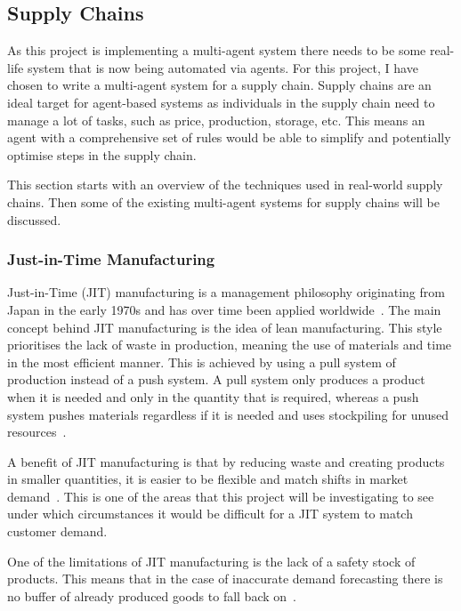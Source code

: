 \subsection{Supply Chains}

As this project is implementing a multi-agent system there needs to be some real-life system that is now being automated via agents.
For this project, I have chosen to write a multi-agent system for a supply chain.
Supply chains are an ideal target for agent-based systems as individuals in the supply chain need to manage a lot of tasks, such as price, production, storage, etc.
This means an agent with a comprehensive set of rules would be able to simplify and potentially optimise steps in the supply chain.

This section starts with an overview of the techniques used in real-world supply chains.
Then some of the existing multi-agent systems for supply chains will be discussed.

\subsubsection{Just-in-Time Manufacturing}

Just-in-Time (JIT) manufacturing is a management philosophy originating from Japan in the early 1970s and has over time been applied worldwide~\cite{javadian2013just}.
The main concept behind JIT manufacturing is the idea of lean manufacturing.
This style prioritises the lack of waste in production, meaning the use of materials and time in the most efficient manner.
This is achieved by using a pull system of production instead of a push system.
A pull system only produces a product when it is needed and only in the quantity that is required, whereas a push system pushes materials regardless if it is needed and uses stockpiling for unused resources~\cite{javadian2013just}.

A benefit of JIT manufacturing is that by reducing waste and creating products in smaller quantities, it is easier to be flexible and match shifts in market demand~\cite{javadian2013just}.
This is one of the areas that this project will be investigating to see under which circumstances it would be difficult for a JIT system to match customer demand.

One of the limitations of JIT manufacturing is the lack of a safety stock of products.
This means that in the case of inaccurate demand forecasting there is no buffer of already produced goods to fall back on~\cite{javadian2013just}.

